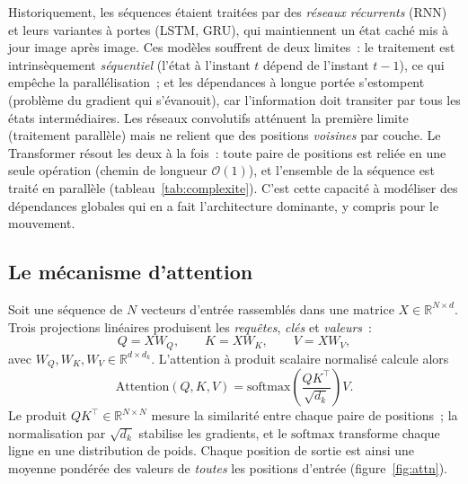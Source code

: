 \documentclass[12pt,a4paper,oneside]{report}
\theoremstyle{definition}
\theoremstyle{plain}
\newcommand{\R}{\mathbb{R}}
\begin{document}
Historiquement, les séquences étaient traitées par des \emph{réseaux récurrents}
(RNN) et leurs variantes à portes (LSTM, GRU), qui maintiennent un état caché mis à
jour image après image. Ces modèles souffrent de deux limites~: le traitement est
intrinsèquement \emph{séquentiel} (l'état à l'instant $t$ dépend de l'instant
$t-1$), ce qui empêche la parallélisation~; et les dépendances à longue portée
s'estompent (problème du gradient qui s'évanouit), car l'information doit transiter
par tous les états intermédiaires. Les réseaux convolutifs atténuent la première
limite (traitement parallèle) mais ne relient que des positions \emph{voisines} par
couche. Le Transformer résout les deux à la fois~: toute paire de positions est
reliée en une seule opération (chemin de longueur $\mathcal{O}(1)$), et l'ensemble
de la séquence est traité en parallèle (tableau~\ref{tab:complexite}). C'est cette
capacité à modéliser des dépendances globales qui en a fait l'architecture
dominante, y compris pour le mouvement.

\subsection{Le mécanisme d'attention}

Soit une séquence de $N$ vecteurs d'entrée rassemblés dans une matrice
$X\in\R^{N\times d}$. Trois projections linéaires produisent les
\emph{requêtes}, \emph{clés} et \emph{valeurs}~:
\begin{equation}
Q = XW_Q,\qquad K = XW_K,\qquad V = XW_V,
\end{equation}
avec $W_Q,W_K,W_V\in\R^{d\times d_k}$. L'attention à produit scalaire normalisé
calcule alors
\begin{equation}
\mathrm{Attention}(Q,K,V) = \mathrm{softmax}\!\left(\frac{QK^{\top}}{\sqrt{d_k}}\right)V .
\label{eq:attention}
\end{equation}
Le produit $QK^{\top}\in\R^{N\times N}$ mesure la similarité entre chaque paire de
positions~; la normalisation par $\sqrt{d_k}$ stabilise les gradients, et le
$\mathrm{softmax}$ transforme chaque ligne en une distribution de poids. Chaque
position de sortie est ainsi une moyenne pondérée des valeurs de \emph{toutes} les
positions d'entrée (figure~\ref{fig:attn}).
\end{document}
